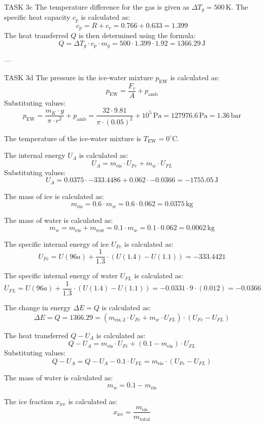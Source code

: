 TASK 3c  
The temperature difference for the gas is given as \( \Delta T_g = 500 \, \text{K} \). The specific heat capacity \( c_p \) is calculated as:  
\[
c_p = R + c_v = 0.766 + 0.633 = 1.399
\]  
The heat transferred \( Q \) is then determined using the formula:  
\[
Q = \Delta T_g \cdot c_p \cdot m_g = 500 \cdot 1.399 \cdot 1.92 = 1366.29 \, \text{J}
\]  

---

TASK 3d  
The pressure in the ice-water mixture \( p_{\text{EW}} \) is calculated as:  
\[
p_{\text{EW}} = \frac{F_c}{A} + p_{\text{amb}}
\]  
Substituting values:  
\[
p_{\text{EW}} = \frac{m_K \cdot g}{\pi \cdot r^2} + p_{\text{amb}} = \frac{32 \cdot 9.81}{\pi \cdot (0.05)^2} + 10^5 \, \text{Pa} = 127976.6 \, \text{Pa} = 1.36 \, \text{bar}
\]  

The temperature of the ice-water mixture is \( T_{\text{EW}} = 0^\circ \text{C} \).  

The internal energy \( U_A \) is calculated as:  
\[
U_A = m_{\text{eis}} \cdot U_{Fe} + m_w \cdot U_{FL}
\]  
Substituting values:  
\[
U_A = 0.0375 \cdot -333.4486 + 0.062 \cdot -0.0366 = -1755.05 \, \text{J}
\]  

The mass of ice is calculated as:  
\[
m_{\text{eis}} = 0.6 \cdot m_w = 0.6 \cdot 0.062 = 0.0375 \, \text{kg}
\]  

The mass of water is calculated as:  
\[
m_w = m_{\text{eis}} + m_{\text{rest}} = 0.1 \cdot m_w = 0.1 \cdot 0.062 = 0.0062 \, \text{kg}
\]  

The specific internal energy of ice \( U_{Fe} \) is calculated as:  
\[
U_{Fe} = U(96a) + \frac{1}{1.3} \cdot (U(1.4) - U(1.1)) = -333.4421
\]  

The specific internal energy of water \( U_{FL} \) is calculated as:  
\[
U_{FL} = U(96a) + \frac{1}{1.3} \cdot (U(1.4) - U(1.1)) = -0.0331 \cdot 9 \cdot (0.012) = -0.0366
\]  

The change in energy \( \Delta E = Q \) is calculated as:  
\[
\Delta E = Q = 1366.29 = (m_{\text{eis},2} \cdot U_{Fe} + m_w \cdot U_{FL}) \cdot (U_{Fe} - U_{FL})
\]  

The heat transferred \( Q - U_A \) is calculated as:  
\[
Q - U_A = m_{\text{eis}} \cdot U_{Fe} + (0.1 - m_{\text{eis}}) \cdot U_{FL}
\]  
Substituting values:  
\[
Q - U_A = Q - U_A - 0.1 \cdot U_{FL} = m_{\text{eis}} \cdot (U_{Fe} - U_{FL})
\]  

The mass of water is calculated as:  
\[
m_w = 0.1 - m_{\text{eis}}
\]  

The ice fraction \( x_{\text{ice}} \) is calculated as:  
\[
x_{\text{ice}} = \frac{m_{\text{eis}}}{m_{\text{total}}}
\]  